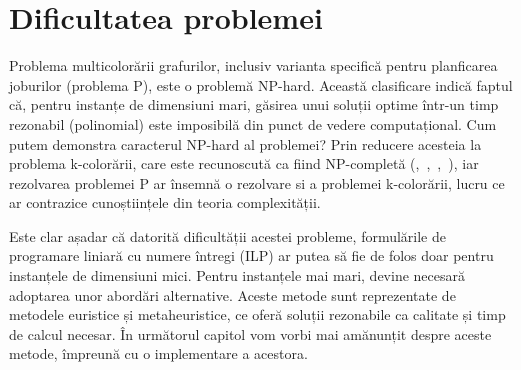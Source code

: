 \section{Dificultatea problemei}
   Problema multicolorării grafurilor, inclusiv varianta specifică pentru planficarea joburilor (problema P), este o problemă NP-hard. Această clasificare indică faptul că, pentru instanțe de dimensiuni mari, găsirea unui soluții optime într-un timp rezonabil (polinomial) este imposibilă din punct de vedere computațional. Cum putem demonstra caracterul NP-hard al problemei? Prin reducere acesteia la problema k-colorării, care este recunoscută ca fiind NP-completă (\cite{garey1979computers},~\cite{gabow1992edgecoloring},~\cite{gandhi2004approximating},~\cite{gandhi2004improved}), iar rezolvarea problemei P ar însemnă o rezolvare si a problemei k-colorării, lucru ce ar contrazice cunoștiințele din teoria complexității.
 
   Este clar așadar că datorită dificultății acestei probleme, formulările de programare liniară cu numere întregi (ILP) ar putea să fie de folos doar pentru instanțele de dimensiuni mici. Pentru instanțele mai mari, devine necesară adoptarea unor abordări alternative. Aceste metode sunt reprezentate de metodele euristice și metaheuristice, ce oferă soluții rezonabile ca calitate și timp de calcul necesar. În următorul capitol vom vorbi mai amănunțit despre aceste metode, împreună cu o implementare a acestora.
